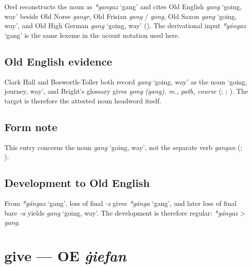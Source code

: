 \documentclass[
  british,
  a4paper,
  openany]{book}
\providecommand{\Recon}[1]{\emph{*#1}}
{\catcode`→=\active \global\def→{\ensuremath{\rightarrow}}}
\providecommand{\texorpdfstring}[2]{#1}
\providecommand{\Recon}[1]{\emph{*#1}}
{\catcode`→=\active \global\def→{\ensuremath{\rightarrow}}}
\begin{document}
Orel reconstructs the noun as \Recon{gangaz} `gang' and cites Old
English {\emph{gang}} `going, way' beside Old Norse \emph{gangr}, Old
Frisian \emph{gang} / \emph{gong}, Old Saxon {\emph{gang}} `going, way',
and Old High German {\emph{gang}} `going, way'
(). The derivational input
\Recon{gángaz} `gang' is the same lexeme in the accent notation used
here.

\subsection{Old English evidence}\label{old-english-evidence-20}

Clark Hall and Bosworth-Toller both record {\emph{gang}} `going, way' as
the noun `going, journey, way', and Bright's glossary gives \emph{gong
(gang), m., path, course} (; ;
). The target
is therefore the attested noun headword itself.

\subsection{Form note}\label{form-note-3}

This entry concerns the noun {\emph{gang}} `going, way', not the
separate verb \emph{gangan} (; ).

\subsection{Development to Old
English}\label{development-to-old-english-20}

From \Recon{gángaz} `gang', loss of final \emph{-z} gives \Recon{gánga}
`gang', and later loss of final bare \emph{-a} yields {\emph{gang}}
`going, way'. The development is therefore regular: \emph{*gángaz}
\textgreater{} \emph{gang}.

\section{\texorpdfstring{give --- OE
\emph{ġiefan}}{give --- OE ġiefan}}\label{give-oe-ux121iefan}

\end{document}
